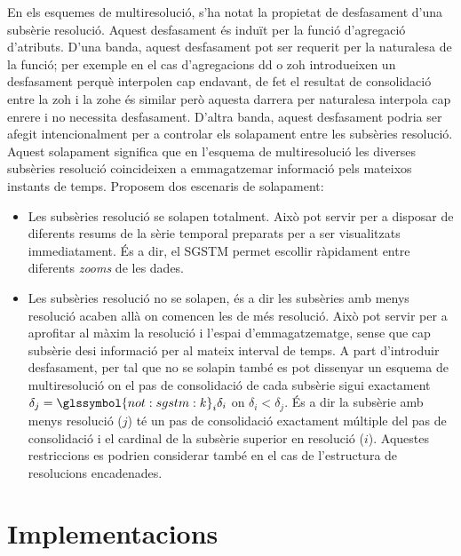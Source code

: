 En els esquemes de multiresolució, s'ha notat la propietat de
desfasament d'una subsèrie resolució. Aquest desfasament és induït per
la funció d'agregació d'atributs. D'una banda, aquest desfasament pot
ser requerit per la naturalesa de la funció; per exemple en el cas
d'agregacions \gls{dd} o \gls{zoh} introdueixen un desfasament perquè
interpolen cap endavant, de fet el resultat de consolidació entre la
\gls{zoh} i la \gls{zohe} és similar però aquesta darrera per
naturalesa interpola cap enrere i no necessita desfasament.  D'altra
banda, aquest desfasament podria ser afegit intencionalment per a
controlar els solapament entre les subsèries resolució.  Aquest
solapament significa que en l'esquema de multiresolució les diverses
subsèries resolució coincideixen a emmagatzemar informació pels
mateixos instants de temps. Proposem dos escenaris de solapament:
\begin{itemize}

\item Les subsèries resolució se solapen totalment. Això pot servir
  per a disposar de diferents resums de la sèrie temporal preparats
  per a ser visualitzats immediatament. És a dir, el \gls{SGSTM}
  permet escollir ràpidament entre diferents \emph{zooms} de les
  dades.

\item Les subsèries resolució no se solapen, és a dir les subsèries
  amb menys resolució acaben allà on comencen les de més
  resolució. Això pot servir per a aprofitar al màxim la resolució i
  l'espai d'emmagatzematge, sense que cap subsèrie desi informació per
  al mateix interval de temps. A part d'introduir desfasament, per tal
  que no se solapin també es pot dissenyar un esquema de
  multiresolució on el pas de consolidació de cada subsèrie sigui
  exactament $\delta_j = \glssymbol{not:sgstm:k}_i\delta_i$ on
  $\delta_i<\delta_j$. És a dir la subsèrie amb menys resolució ($j$)
  té un pas de consolidació exactament múltiple del pas de
  consolidació i el cardinal de la subsèrie superior en resolució
  ($i$). Aquestes restriccions es podrien considerar també en el cas
  de l'estructura de resolucions encadenades.
\end{itemize}











\section{Implementacions}


